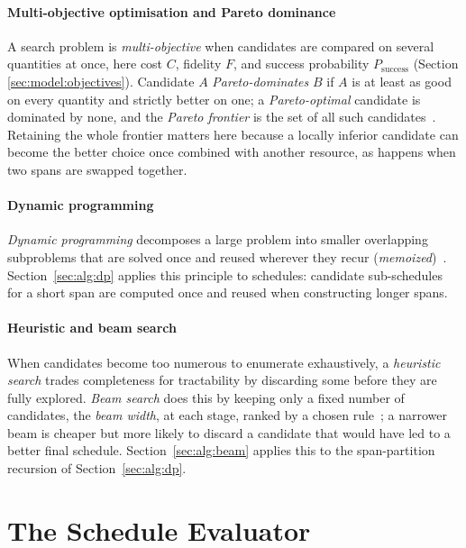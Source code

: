 \paragraph{Multi-objective optimisation and Pareto dominance} A search problem is \emph{multi-objective} when candidates are compared on several quantities at once, here cost $C$, fidelity $F$, and success probability $P_{\mathrm{success}}$ (Section \ref{sec:model:objectives}). Candidate $A$ \emph{Pareto-dominates} $B$ if $A$ is at least as good on every quantity and strictly better on one; a \emph{Pareto-optimal} candidate is dominated by none, and the \emph{Pareto frontier} is the set of all such candidates~\cite{Pareto2014Manual,Deb2002Fast,Ehrgott2005Multicriteria}. Retaining the whole frontier matters here because a locally inferior candidate can become the better choice once combined with another resource, as happens when two spans are swapped together.

\paragraph{Dynamic programming} \emph{Dynamic programming} decomposes a large problem into smaller overlapping subproblems that are solved once and reused wherever they recur (\emph{memoized})~\cite{Bellman1984Dynamic}. Section~\ref{sec:alg:dp} applies this principle to schedules: candidate sub-schedules for a short span are computed once and reused when constructing longer spans.

\paragraph{Heuristic and beam search} When candidates become too numerous to enumerate exhaustively, a \emph{heuristic search} trades completeness for tractability by discarding some before they are fully explored. \emph{Beam search} does this by keeping only a fixed number of candidates, the \emph{beam width}, at each stage, ranked by a chosen rule~\cite{Lowerre1976HARPY,Huang2018When,Meister2022BestFirst}; a narrower beam is cheaper but more likely to discard a candidate that would have led to a better final schedule. Section~\ref{sec:alg:beam} applies this to the span-partition recursion of Section~\ref{sec:alg:dp}.

\section{The Schedule Evaluator}
\label{sec:alg:evaluator}

